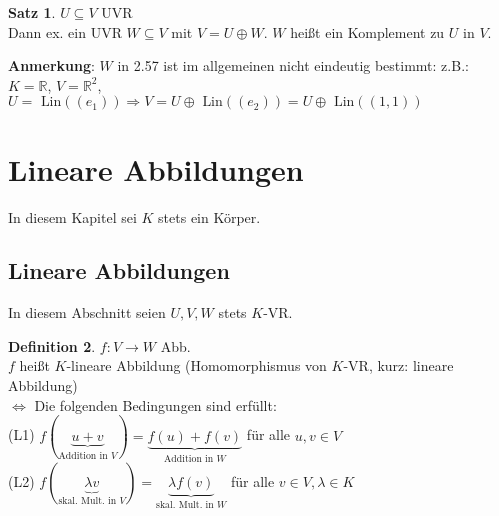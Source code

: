 \documentclass[10pt,a4paper,numbers=endperiod]{scrartcl}
\theoremstyle{definition}
\newtheorem{satz}{Satz}[section]
\newtheorem{defi}[satz]{Definition}
\def\RR{{\mathbb R}}
\begin{document}
\begin{satz}
	$U \subseteq V$ UVR\\
	Dann ex. ein UVR $W\subseteq V$ mit $V=U\oplus W$. $W$ heißt ein Komplement zu $U$ in $V$.
\end{satz}

\textbf{Anmerkung}: $W$ in 2.57 ist im allgemeinen nicht eindeutig bestimmt: 
z.B.: $K=\RR$, $V=\RR^2$, $U=\text{ Lin}((e_1)) \Rightarrow V= U \oplus \text{ Lin}((e_2))=U \oplus\text{ Lin}((1,1))$
\newpage
\section{Lineare Abbildungen}
In diesem Kapitel sei $K$ stets ein Körper.

\subsection{Lineare Abbildungen}
In diesem Abschnitt seien $U,V,W$ stets $K$-VR.

\begin{defi}
	$f:V\rightarrow W$ Abb.\\
	$f$ heißt $K$-lineare Abbildung (Homomorphismus von $K$-VR, kurz: lineare Abbildung)\\
	$\Leftrightarrow$ Die folgenden Bedingungen sind erfüllt:\\
	(L1) $f(\underbrace{u+v}_{\text{Addition in }V}) = \underbrace{f(u)+f(v)}_{\text{Addition in }W}$ für alle $u,v \in V$\\
	(L2) $f(\underbrace{\lambda v}_{\text{skal. Mult. in }V}) = \underbrace{\lambda f(v)}_{\text{skal. Mult. in }W}$ für alle $v \in V, \lambda \in K$
\end{defi}
\end{document}
